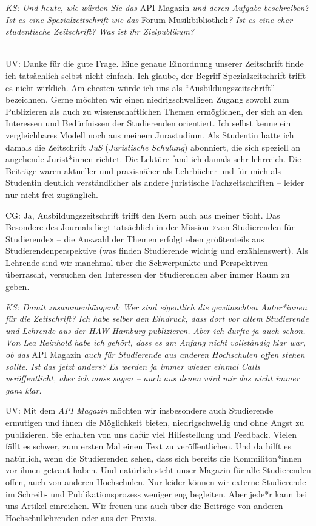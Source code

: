 \documentclass[a4paper,
fontsize=11pt,
oneside,
numbers=noperiodatend,
parskip=half-,
bibliography=totoc,
final
]{scrartcl}
\begin{document}
\emph{KS: Und heute, wie würden Sie das} API Magazin \emph{und deren
Aufgabe beschreiben? Ist es eine Spezialzeitschrift wie das} Forum
Musikbibliothek\emph{? Ist es eine eher studentische Zeitschrift? Was
ist ihr Zielpublikum?}\\
\strut \\
UV: Danke für die gute Frage. Eine genaue Einordnung unserer Zeitschrift
finde ich tatsächlich selbst nicht einfach. Ich glaube, der Begriff
Spezialzeitschrift trifft es nicht wirklich. Am ehesten würde ich uns
als \enquote{Ausbildungszeitschrift} bezeichnen. Gerne möchten wir einen
niedrigschwelligen Zugang sowohl zum Publizieren als auch zu
wissenschaftlichen Themen ermöglichen, der sich an den Interessen und
Bedürfnissen der Studierenden orientiert. Ich selbst kenne ein
vergleichbares Modell noch aus meinem Jurastudium. Als Studentin hatte
ich damals die Zeitschrift \emph{JuS} (\emph{Juristische Schulung})
abonniert, die sich speziell an angehende Jurist*innen richtet. Die
Lektüre fand ich damals sehr lehrreich. Die Beiträge waren aktueller und
praxisnäher als Lehrbücher und für mich als Studentin deutlich
verständlicher als andere juristische Fachzeitschriften -- leider nur
nicht frei zugänglich.

CG: Ja, Ausbildungszeitschrift trifft den Kern auch aus meiner Sicht.
Das Besondere des Journals liegt tatsächlich in der Mission «von
Studierenden für Studierende» -- die Auswahl der Themen erfolgt eben
größtenteils aus Studierendenperspektive (was finden Studierende wichtig
und erzählenswert). Als Lehrende sind wir manchmal über die Schwerpunkte
und Perspektiven überrascht, versuchen den Interessen der Studierenden
aber immer Raum zu geben.

\emph{KS: Damit zusammenhängend: Wer sind eigentlich die gewünschten
Autor*innen für die Zeitschrift? Ich habe selber den Eindruck, dass dort
vor allem Studierende und Lehrende aus der HAW Hamburg publizieren. Aber
ich durfte ja auch schon. Von Lea Reinhold habe ich gehört, dass es am
Anfang nicht vollständig klar war, ob das} API Magazin \emph{auch für
Studierende aus anderen Hochschulen offen stehen sollte. Ist das jetzt
anders? Es werden ja immer wieder einmal Calls veröffentlicht, aber ich
muss sagen -- auch aus denen wird mir das nicht immer ganz klar.}

UV: Mit dem \emph{API Magazin} möchten wir insbesondere auch Studierende
ermutigen und ihnen die Möglichkeit bieten, niedrigschwellig und ohne
Angst zu publizieren. Sie erhalten von uns dafür viel Hilfestellung und
Feedback. Vielen fällt es schwer, zum ersten Mal einen Text zu
veröffentlichen. Und da hilft es natürlich, wenn die Studierenden sehen,
dass sich bereits die Kommiliton*innen vor ihnen getraut haben. Und
natürlich steht unser Magazin für alle Studierenden offen, auch von
anderen Hochschulen. Nur leider können wir externe Studierende im
Schreib- und Publikationsprozess weniger eng begleiten. Aber jede*r kann
bei uns Artikel einreichen. Wir freuen uns auch über die Beiträge von
anderen Hochschullehrenden oder aus der Praxis.
\end{document}
